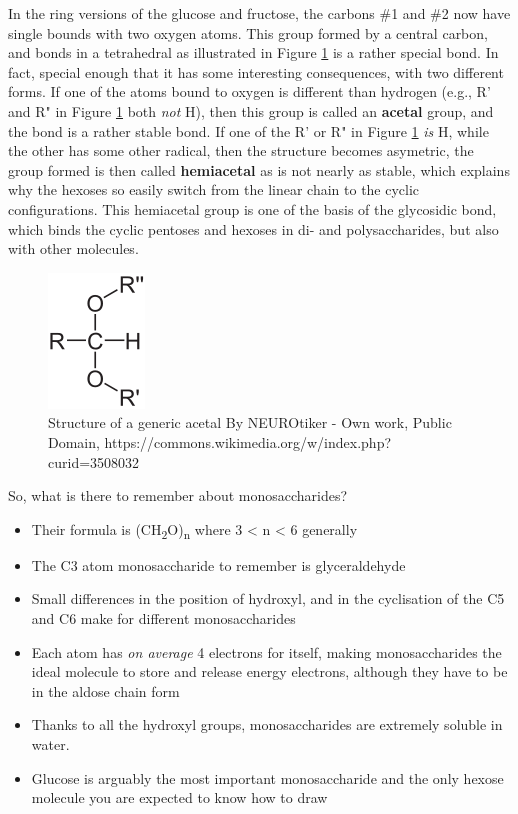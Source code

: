 \documentclass[]{book}
\providecommand{\tightlist}{%
  \setlength{\itemsep}{0pt}\setlength{\parskip}{0pt}}
\theoremstyle{definition}
\theoremstyle{definition}
\theoremstyle{definition}
\theoremstyle{remark}
\begin{document}
In the ring versions of the glucose and fructose, the carbons \#1 and
\#2 now have single bounds with two oxygen atoms. This group formed by a
central carbon, and bonds in a tetrahedral as illustrated in Figure
\ref{fig:acetal} is a rather special bond. In fact, special enough that
it has some interesting consequences, with two different forms. If one
of the atoms bound to oxygen is different than hydrogen (e.g., R' and R"
in Figure \ref{fig:acetal} both \emph{not} H), then this group is called
an \textbf{acetal} group, and the bond is a rather stable bond. If one
of the R' or R" in Figure \ref{fig:acetal} \emph{is} H, while the other
has some other radical, then the structure becomes asymetric, the group
formed is then called \textbf{hemiacetal} as is not nearly as stable,
which explains why the hexoses so easily switch from the linear chain to
the cyclic configurations. This hemiacetal group is one of the basis of
the glycosidic bond, which binds the cyclic pentoses and hexoses in di-
and polysaccharides, but also with other molecules.

\begin{figure}

{\centering \includegraphics[width=0.13\linewidth]{pictures/generic-acetal} 

}

\caption{Structure of a generic acetal By NEUROtiker - Own work, Public Domain, https://commons.wikimedia.org/w/index.php?curid=3508032 }\label{fig:acetal}
\end{figure}

So, what is there to remember about monosaccharides?

\begin{itemize}
\tightlist
\item
  Their formula is (CH\textsubscript{2}O)\textsubscript{n} where 3
  \textless{} n \textless{} 6 generally
\item
  The C3 atom monosaccharide to remember is glyceraldehyde
\item
  Small differences in the position of hydroxyl, and in the cyclisation
  of the C5 and C6 make for different monosaccharides
\item
  Each atom has \emph{on average} 4 electrons for itself, making
  monosaccharides the ideal molecule to store and release energy
  electrons, although they have to be in the aldose chain form
\item
  Thanks to all the hydroxyl groups, monosaccharides are extremely
  soluble in water.
\item
  Glucose is arguably the most important monosaccharide and the only
  hexose molecule you are expected to know how to draw
\end{itemize}
\end{document}
